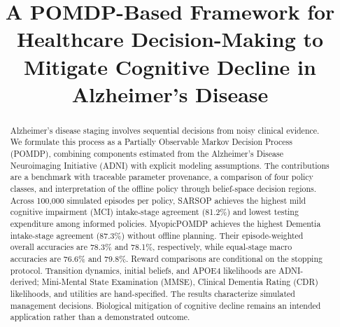 \documentclass[conference,a4paper]{IEEEtran}
\begin{document}
\raggedbottom

\title{A POMDP-Based Framework for Healthcare Decision-Making
to Mitigate Cognitive Decline in Alzheimer's Disease}

\author{%
\and
{}
}
\maketitle

\begin{abstract}
Alzheimer's disease staging involves sequential decisions from noisy
clinical evidence. We formulate this process as a Partially Observable
Markov Decision Process (POMDP), combining components estimated from the
Alzheimer's Disease Neuroimaging Initiative (ADNI) with explicit modeling
assumptions. The contributions are a benchmark with traceable parameter
provenance, a comparison of four policy classes, and interpretation of
the offline policy through belief-space decision regions. Across 100,000
simulated episodes per policy, SARSOP achieves the highest mild cognitive
impairment (MCI) intake-stage agreement (81.2\%) and lowest testing
expenditure among informed policies. MyopicPOMDP achieves the highest
Dementia intake-stage agreement (87.3\%) without offline planning.
Their episode-weighted overall accuracies are 78.3\% and 78.1\%,
respectively, while equal-stage macro accuracies are 76.6\% and 79.8\%.
Reward comparisons are conditional on the stopping protocol. Transition
dynamics, initial beliefs, and APOE4 likelihoods are ADNI-derived;
Mini-Mental State Examination (MMSE), Clinical Dementia Rating (CDR)
likelihoods, and utilities are hand-specified. The results characterize
simulated management decisions. Biological mitigation of cognitive
decline remains an intended application rather than a demonstrated outcome.
\end{abstract}
\end{document}
